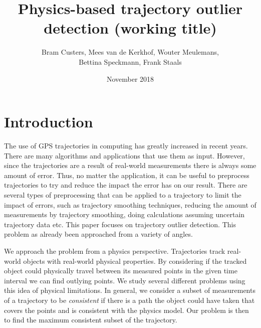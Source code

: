 \documentclass{article}
\title{Physics-based trajectory outlier detection (working title)}
\author{Bram Custers, Mees van de Kerkhof, Wouter Meulemans,\\ Bettina Speckmann, Frank Staals}
\date{November 2018}
\begin{document}
\maketitle

\section{Introduction}
The use of GPS trajectories in computing has greatly increased in recent years. There are many algorithms and applications that use them as input. However, since the trajectories are a result of real-world measurements there is always some amount of error. Thus, no matter the application, it can be useful to preprocess trajectories to try and reduce the impact the error has on our result. 
There are several types of preprocessing that can be applied to a trajectory to limit the impact of errors, such as trajectory smoothing techniques, reducing the amount of measurements by trajectory smoothing, doing calculations assuming uncertain trajectory data etc.
This paper focuses on trajectory outlier detection. This problem as already been approached from a variety of angles. 

We approach the problem from a physics perspective. Trajectories track real-world objects with real-world physical properties. By considering if the tracked object could physically travel between its measured points in the given time interval we can find outlying points. 
We study several different problems using this idea of physical limitations. In general, we consider a subset of measurements of a trajectory to be \emph{consistent} if there is a path the object could have taken that covers the points and is consistent with the physics model. Our problem is then to find the maximum consistent subset of the trajectory.
\end{document}
